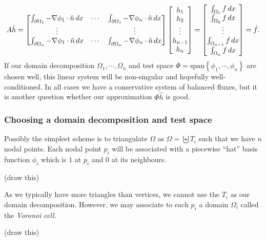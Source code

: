 \newcommand{\integralentry}[2]{\int_{\pom_{#1}}-\nabla\phi_{#2}\cdot\hat{n}\,dx}
\begin{equation}\label{poisson_matrix_equation}
    A\hat{h} = \begin{bmatrix}
            \integralentry{1}{1} & \cdots & \integralentry{1}{n} \\
            \vdots & & \vdots \\
            \integralentry{n}{1} & \cdots & \integralentry{n}{n}
            \end{bmatrix}
    \begin{bmatrix} h_1 \\ h_2 \\ \vdots \\ h_{n-1} \\ h_n \end{bmatrix}
    =
    \begin{bmatrix} \int_{\om_1}f\,dx \\ \int_{\om_2}f\,dx \\ \vdots \\ \int_{\om_{n-1}}f\,dx \\ \int_{\om_n}f\,dx \end{bmatrix}
    = \hat{f}.
\end{equation}
If our domain decomposition $\Omega_1,\cdots,\Omega_n$ and test space $\Phi = \text{span}\left\{\phi_1,\cdots,\phi_n\right\}$
are chosen well, this linear system will be non-singular and hopefully well-conditioned.
In all cases we have a conservative system of balanced fluxes, but it is another question whether our approximation
$\Phi\hat{h}$ is good.

\subsubsection{Choosing a domain decomposition and test space}
Possibly the simplest scheme is to triangulate $\Omega$ as
    $\Omega = \biguplus T_i$
such that we have $n$ nodal points.
Each nodal point $p_i$ will be associated with a piecewise ``hat'' basis function $\phi_i$ which is $1$ at $p_i$ and
$0$ at its neighbours.

\vskip 0.2in
(draw this)
\vskip 0.2in

As we typically have more triangles than vertices, we cannot use the $T_i$ as our domain decomposition. However, we may
associate to each $p_i$ a domain $\Omega_i$ called the \textit{Voronoi cell}.

\vskip 0.2in
(draw this)
\vskip 0.2in


